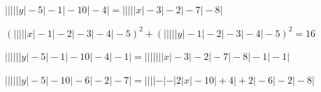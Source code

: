  $\left|\left|\left|\left|\left|y\right|-5\right|-1\right|-10\right|-4\right|=\left|\left|\left|\left|\left|x\right|-3\right|-2\right|-7\right|-8\right|$

 $\left(\left|\left|\left|\left|\left|x\right|-1\right|-2\right|-3\right|-4\right|-5\right)^{2}+\left(\left|\left|\left|\left|\left|y\right|-1\right|-2\right|-3\right|-4\right|-5\right)^{2}=16$

 $\left|\left|\left|\left|\left|\left|y\right|-5\right|-1\right|-10\right|-4\right|-1\right|=\left|\left|\left|\left|\left|\left|\left|x\right|-3\right|-2\right|-7\right|-8\right|-1\right|-1\right|$

$\left|\left|\left|\left|\left|\left|y\right|-5\right|-10\right|-6\right|-2\right|-7\right|=\left|\left|\left|\left|-\left|-\left|2\left|x\right|-10\right|+4\right|+2\right|-6\right|-2\right|-8\right|$